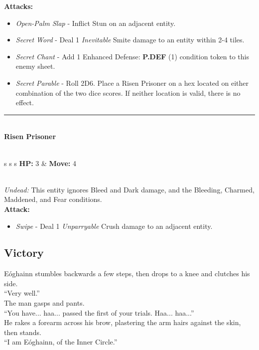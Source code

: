 \textbf{Attacks:}
\begin{itemize}
\item \emph{Open-Palm Slap} -  Inflict Stun on an adjacent entity.
\item \emph{Secret Word} - Deal 1 \emph{Inevitable} Smite damage to an entity within 2-4 tiles.
\item \emph{Secret Chant} - Add 1 Enhanced Defense: \textbf{P.DEF} (1) condition token to this enemy sheet.
\item \emph{Secret Parable} - Roll 2D6. Place a Risen Prisoner on a hex located on either combination of the two dice scores. If neither location is valid, there is no effect.
\end{itemize}
\hrule
\ \\
{\large \textbf{Risen Prisoner}}\\\\
\begin{tabular}{s s s}
\textbf{HP:} 3 & \textbf{Move:} 4\\
\end{tabular}\\

\emph{Undead:} This entity ignores Bleed and Dark damage, and the Bleeding, Charmed, Maddened, and Fear conditions.\\

\textbf{Attack:}
\begin{itemize}
\item \emph{Swipe} -  Deal 1 \emph{Unparryable} Crush damage to an adjacent entity.
\end{itemize}
\pagebreak

\subsection*{Victory}
Eóghainn stumbles backwards a few steps, then drops to a knee and clutches his side.\\

“Very well.”\\

The man gasps and pants.\\
“You have... haa... passed the first of your trials. Haa... haa...”\\

He rakes a forearm across his brow, plastering the arm hairs against the skin, then stands.\\

“I am Eóghainn, of the Inner Circle.”\\

